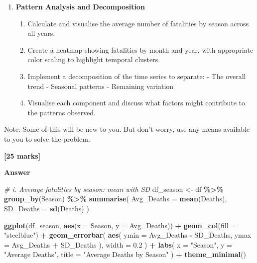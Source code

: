 \documentclass[
  10t,
]{article}
\newenvironment{Shaded}{\begin{snugshade}}{\end{snugshade}}
\newcommand{\AttributeTok}[1]{\textcolor[rgb]{0.13,0.29,0.53}{#1}}
\newcommand{\CommentTok}[1]{\textcolor[rgb]{0.56,0.35,0.01}{\textit{#1}}}
\newcommand{\FloatTok}[1]{\textcolor[rgb]{0.00,0.00,0.81}{#1}}
\newcommand{\FunctionTok}[1]{\textcolor[rgb]{0.13,0.29,0.53}{\textbf{#1}}}
\newcommand{\NormalTok}[1]{#1}
\newcommand{\OtherTok}[1]{\textcolor[rgb]{0.56,0.35,0.01}{#1}}
\newcommand{\SpecialCharTok}[1]{\textcolor[rgb]{0.81,0.36,0.00}{\textbf{#1}}}
\newcommand{\StringTok}[1]{\textcolor[rgb]{0.31,0.60,0.02}{#1}}
\providecommand{\tightlist}{%
  \setlength{\itemsep}{0pt}\setlength{\parskip}{0pt}}\usepackage{longtable,booktabs,array}
\begin{document}
\begin{enumerate}
\def\labelenumi{\alph{enumi}.}
\setcounter{enumi}{2}
\tightlist
\item
  \textbf{Pattern Analysis and Decomposition}

  \begin{enumerate}
  \def\labelenumii{\roman{enumii}.}
  \tightlist
  \item
    Calculate and visualise the average number of fatalities by season
    across all years.
  \item
    Create a heatmap showing fatalities by month and year, with
    appropriate color scaling to highlight temporal clusters.
  \item
    Implement a decomposition of the time series to separate: - The
    overall trend - Seasonal patterns - Remaining variation
  \item
    Visualise each component and discuss what factors might contribute
    to the patterns observed.
  \end{enumerate}
\end{enumerate}

Note: Some of this will be new to you. But don't worry, use any means
available to you to solve the problem.

\textbf{{[}25 marks{]}}

\textbf{Answer}

\begin{Shaded}
\begin{Highlighting}[]
\CommentTok{\# i. Average fatalities by season: mean with SD}
\NormalTok{df\_season }\OtherTok{\textless{}{-}}\NormalTok{ df }\SpecialCharTok{\%\textgreater{}\%}
  \FunctionTok{group\_by}\NormalTok{(Season) }\SpecialCharTok{\%\textgreater{}\%}
  \FunctionTok{summarise}\NormalTok{(}
    \AttributeTok{Avg\_Deaths =} \FunctionTok{mean}\NormalTok{(Deaths),}
    \AttributeTok{SD\_Deaths  =} \FunctionTok{sd}\NormalTok{(Deaths)}
\NormalTok{  )}

\FunctionTok{ggplot}\NormalTok{(df\_season, }\FunctionTok{aes}\NormalTok{(}\AttributeTok{x =}\NormalTok{ Season, }\AttributeTok{y =}\NormalTok{ Avg\_Deaths)) }\SpecialCharTok{+}
  \FunctionTok{geom\_col}\NormalTok{(}\AttributeTok{fill =} \StringTok{"steelblue"}\NormalTok{) }\SpecialCharTok{+}
  \FunctionTok{geom\_errorbar}\NormalTok{(}
    \FunctionTok{aes}\NormalTok{(}
      \AttributeTok{ymin =}\NormalTok{ Avg\_Deaths }\SpecialCharTok{{-}}\NormalTok{ SD\_Deaths,}
      \AttributeTok{ymax =}\NormalTok{ Avg\_Deaths }\SpecialCharTok{+}\NormalTok{ SD\_Deaths}
\NormalTok{    ),}
    \AttributeTok{width =} \FloatTok{0.2}
\NormalTok{  ) }\SpecialCharTok{+}
  \FunctionTok{labs}\NormalTok{(}
    \AttributeTok{x =} \StringTok{"Season"}\NormalTok{,}
    \AttributeTok{y =} \StringTok{"Average Deaths"}\NormalTok{,}
    \AttributeTok{title =} \StringTok{"Average Deaths by Season"}
\NormalTok{  ) }\SpecialCharTok{+}
  \FunctionTok{theme\_minimal}\NormalTok{()}
\end{Highlighting}
\end{Shaded}
\end{document}

